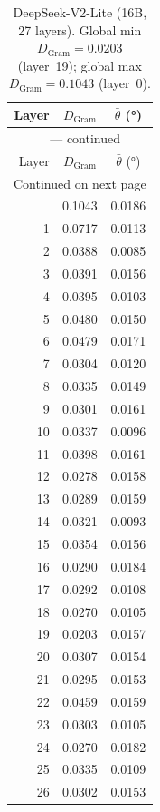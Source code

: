 \begin{longtable}{rcc}
\caption{DeepSeek-V2-Lite (16B, 27 layers).
         Global min $D_\text{Gram} = 0.0203$ (layer~19);
         global max $D_\text{Gram} = 0.1043$ (layer~0).}
\label{tab:v2lite-layers} \\
\toprule
Layer & $D_\text{Gram}$ & $\bar\theta$ (°) \\
\midrule
\endfirsthead
\multicolumn{3}{c}{\tablename~\thetable{} --- continued} \\
\toprule
Layer & $D_\text{Gram}$ & $\bar\theta$ (°) \\
\midrule
\endhead
\midrule
\multicolumn{3}{r}{Continued on next page} \\
\endfoot
\bottomrule
\endlastfoot
 0 & 0.1043 & 0.0186 \\
 1 & 0.0717 & 0.0113 \\
 2 & 0.0388 & 0.0085 \\
 3 & 0.0391 & 0.0156 \\
 4 & 0.0395 & 0.0103 \\
 5 & 0.0480 & 0.0150 \\
 6 & 0.0479 & 0.0171 \\
 7 & 0.0304 & 0.0120 \\
 8 & 0.0335 & 0.0149 \\
 9 & 0.0301 & 0.0161 \\
10 & 0.0337 & 0.0096 \\
11 & 0.0398 & 0.0161 \\
12 & 0.0278 & 0.0158 \\
13 & 0.0289 & 0.0159 \\
14 & 0.0321 & 0.0093 \\
15 & 0.0354 & 0.0156 \\
16 & 0.0290 & 0.0184 \\
17 & 0.0292 & 0.0108 \\
18 & 0.0270 & 0.0105 \\
19 & 0.0203 & 0.0157 \\
20 & 0.0307 & 0.0154 \\
21 & 0.0295 & 0.0153 \\
22 & 0.0459 & 0.0159 \\
23 & 0.0303 & 0.0105 \\
24 & 0.0270 & 0.0182 \\
25 & 0.0335 & 0.0109 \\
26 & 0.0302 & 0.0153 \\
\end{longtable}

